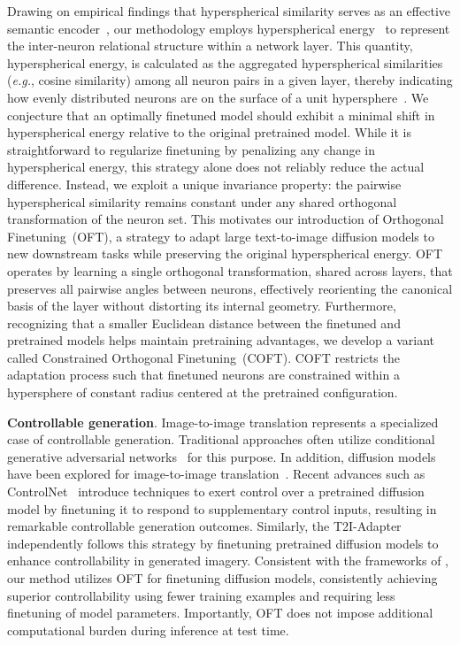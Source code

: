 Drawing on empirical findings that hyperspherical similarity serves as an effective semantic encoder~\cite{liu2017deep,liu2018decoupled,chen2020angular}, our methodology employs hyperspherical energy~\cite{liu2018learning} to represent the inter-neuron relational structure within a network layer. This quantity, hyperspherical energy, is calculated as the aggregated hyperspherical similarities (\emph{e.g.}, cosine similarity) among all neuron pairs in a given layer, thereby indicating how evenly distributed neurons are on the surface of a unit hypersphere~\cite{liu2021learning}. We conjecture that an optimally finetuned model should exhibit a minimal shift in hyperspherical energy relative to the original pretrained model. While it is straightforward to regularize finetuning by penalizing any change in hyperspherical energy, this strategy alone does not reliably reduce the actual difference. Instead, we exploit a unique invariance property: the pairwise hyperspherical similarity remains constant under any shared orthogonal transformation of the neuron set. This motivates our introduction of Orthogonal Finetuning~(OFT), a strategy to adapt large text-to-image diffusion models to new downstream tasks while preserving the original hyperspherical energy. OFT operates by learning a single orthogonal transformation, shared across layers, that preserves all pairwise angles between neurons, effectively reorienting the canonical basis of the layer without distorting its internal geometry. Furthermore, recognizing that a smaller Euclidean distance between the finetuned and pretrained models helps maintain pretraining advantages, we develop a variant called Constrained Orthogonal Finetuning~(COFT). COFT restricts the adaptation process such that finetuned neurons are constrained within a hypersphere of constant radius centered at the pretrained configuration.

\textbf{Controllable generation}. Image-to-image translation represents a specialized case of controllable generation. Traditional approaches often utilize conditional generative adversarial networks~\cite{isola2017image,zhu2017toward,wang2018high,park2019semantic,choi2018stargan} for this purpose. In addition, diffusion models have been explored for image-to-image translation~\cite{saharia2022palette,voynov2022sketch,wang2022pretraining}. Recent advances such as ControlNet~\cite{zhang2023adding} introduce techniques to exert control over a pretrained diffusion model by finetuning it to respond to supplementary control inputs, resulting in remarkable controllable generation outcomes. Similarly, the T2I-Adapter~\cite{mou2023t2i} independently follows this strategy by finetuning pretrained diffusion models to enhance controllability in generated imagery. Consistent with the frameworks of \cite{zhang2023adding,mou2023t2i}, our method utilizes OFT for finetuning diffusion models, consistently achieving superior controllability using fewer training examples and requiring less finetuning of model parameters. Importantly, OFT does not impose additional computational burden during inference at test time.

